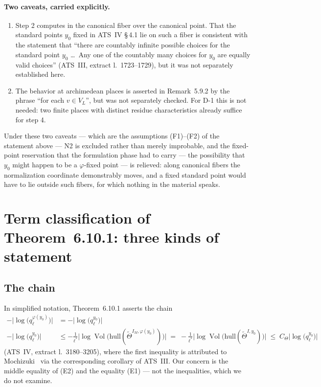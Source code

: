 \documentclass[11pt,a4paper]{article}
\theoremstyle{definition}
\theoremstyle{plain}
\theoremstyle{definition}
\newcommand{\Vol}{\operatorname{Vol}}
\newcommand{\Thet}{\widetilde{\Theta}}
\newcommand{\anchor}[2]{(#1, extract l.~#2)}
\begin{document}
\paragraph{Two caveats, carried explicitly.}
\begin{enumerate}
\item[(i)] Step 2 computes in the canonical fiber over the canonical point. That
  the standard points $y_0$ fixed in ATS~IV \S\,4.1 lie on such a fiber is
  consistent with the statement that ``there are countably infinite possible
  choices for the standard point $y_0$ \ldots\ Any one of the countably many
  choices for $y_0$ are equally valid choices'' \anchor{ATS~III}{1723--1729}, but
  it was not separately established here.
\item[(ii)] The behavior at archimedean places is asserted in Remark~5.9.2 by the
  phrase ``for each $v \in V_L$'', but was not separately checked. For D-1 this is
  not needed: two finite places with distinct residue characteristics already
  suffice for step 4.
\end{enumerate}

Under these two caveats --- which are the assumptions (F1)--(F2) of the statement
above --- N2 is excluded rather than merely improbable, and the
fixed-point reservation that the formulation phase had to carry --- the
possibility that $y_0$ might happen to be a $\varphi$-fixed point --- is relieved:
along canonical fibers the normalization coordinate demonstrably moves, and a
fixed standard point would have to lie outside such fibers, for which nothing in
the material speaks.

\section{Term classification of Theorem~6.10.1: three kinds of statement}
\label{sec:terms}

\subsection{The chain}

In simplified notation, Theorem~6.10.1 asserts the chain
\begin{align}
  -\bigl|\log\bigl(q_\ell^{\varphi(y_0)}\bigr)\bigr| &= -\bigl|\log\bigl(q_\ell^{y_0}\bigr)\bigr|
  \tag{E1}\\[2pt]
  -\bigl|\log\bigl(q_\ell^{y_0}\bigr)\bigr|
  &\le -\tfrac{1}{\ell^*}\bigl|\log \Vol\bigl(\mathrm{hull}(\Thet^{I_M,\varphi(y_0)})\bigr)\bigr|
  \;=\; -\tfrac{1}{\ell^*}\bigl|\log \Vol\bigl(\mathrm{hull}(\Thet^{I,y_0})\bigr)\bigr|
  \;\le\; C_\Theta \bigl|\log\bigl(q_\ell^{y_0}\bigr)\bigr|
  \tag{E2}
\end{align}
\anchor{ATS~IV}{3180--3205}, where the first inequality is attributed to Mochizuki~\cite{Mochizuki2021c}
via the corresponding corollary of ATS~III. Our concern is
the middle equality of (E2) and the equality (E1) --- not the inequalities, which
we do not examine.
\end{document}
